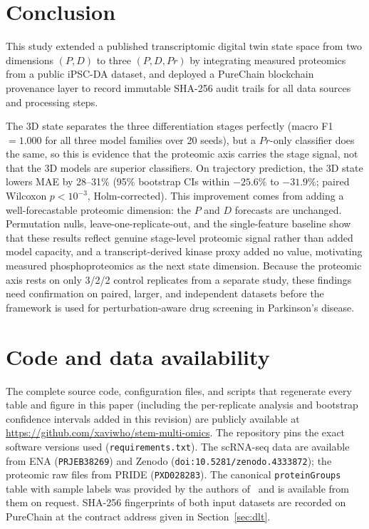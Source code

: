 \documentclass[5p,times,twocolumn]{elsarticle}
\newcommand{\rtag}[1]{}
\newcommand{\rev}[2]{\rtag{#1}#2}
\newenvironment{revblock}[1]{\par\rtag{#1}\ignorespaces}{\par}
\begin{document}
\section{Conclusion}
This study extended a published transcriptomic digital twin
state space from two dimensions $(P, D)$ to three
$(P, D, Pr)$ by integrating measured proteomics from a
public iPSC-DA dataset, and deployed a PureChain blockchain
provenance layer to record immutable SHA-256 audit trails
for all data sources and processing steps.
\begin{revblock}{R1.8,R1.9,R1.5,R1.14}
  The 3D state separates the three differentiation stages
  perfectly (macro F1 $= 1.000$ for all three model families over
  20 seeds), but a $Pr$-only classifier does the same, so this is
  evidence that the proteomic axis carries the stage signal, not
  that the 3D models are superior classifiers.
  On trajectory prediction, the 3D state lowers MAE by 28--31\%
  (95\% bootstrap CIs within $-25.6\%$ to $-31.9\%$; paired
  Wilcoxon $p < 10^{-3}$, Holm-corrected). This improvement
  comes from adding a well-forecastable proteomic dimension: the
  $P$ and $D$ forecasts are unchanged.
  Permutation nulls, leave-one-replicate-out, and the
  single-feature baseline show that these results reflect genuine
  stage-level proteomic signal rather than added model capacity,
  and a transcript-derived kinase proxy added no value,
  motivating measured phosphoproteomics as the next state
  dimension.
  Because the proteomic axis rests on only 3/2/2 control
  replicates from a separate study, these findings need
  confirmation on paired, larger, and independent datasets before
  the framework is used for perturbation-aware drug screening in
  Parkinson's disease.
\end{revblock}
\section*{\rev{R2.7}{Code and data availability}}

\begin{revblock}{R2.7}
  The complete source code, configuration files, and scripts that
  regenerate every table and figure in this paper (including the
  per-replicate analysis and bootstrap confidence intervals added
  in this revision) are publicly available at
  \url{https://github.com/xaviwho/stem-multi-omics}.
  The repository pins the exact software versions used
  (\texttt{requirements.txt}).
  The scRNA-seq data are available from ENA (\texttt{PRJEB38269})
  and Zenodo (\texttt{doi:10.5281/zenodo.4333872}); the proteomic
  raw files from PRIDE (\texttt{PXD028283}). The canonical
  \texttt{proteinGroups} table with sample labels was provided by
  the authors of~\cite{novak2022single} and is available from
  them on request. SHA-256 fingerprints of both input datasets
  are recorded on PureChain at the contract address given in
  Section~\ref{sec:dlt}.
\end{revblock}
\end{document}
